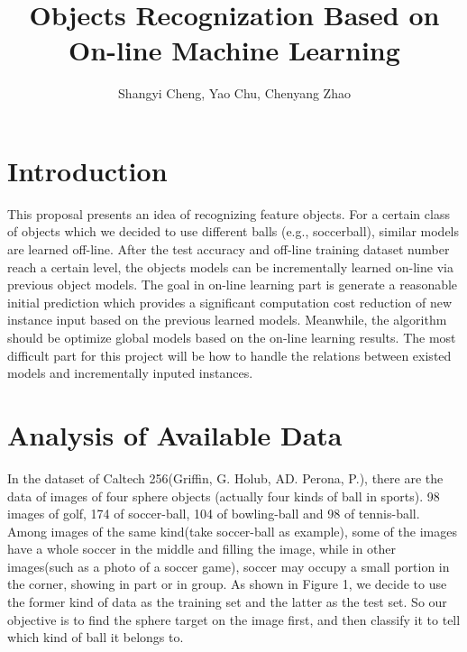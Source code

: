\documentclass[CEJM,PDF]{cej} %
\title{Objects Recognization Based on On-line Machine Learning}
\author{Shangyi Cheng\inst{}\email{shangyi@seas.upenn.edu}, Yao Chu\inst{}\email{chuyao@seas.upenn.edu}, Chenyang Zhao\inst{}\email{chzhao@seas.upenn.edu}}
\institute{University of Pennsylvania}
\begin{document}
\maketitle
\vspace*{-20pt}
\section{Introduction}
\vspace*{-10pt}
This proposal presents an idea of recognizing feature objects. For a certain class of objects which we decided to use different balls (e.g., soccerball), similar models are learned off-line. After the test accuracy and off-line training dataset number reach a certain level, the objects models can be incrementally learned on-line via previous object models. The goal in on-line learning part is generate a reasonable initial prediction which provides a significant computation cost reduction of new instance input based on the previous learned models. Meanwhile, the algorithm should be optimize global models based on the on-line learning results. The most difficult part for this project will be how to handle the relations between existed models and incrementally inputed instances. 
\vspace*{-20pt}
\section{Analysis of Available Data}
\vspace*{-10pt}
In the dataset of Caltech 256(Griffin, G. Holub, AD. Perona, P.), there are the data of images of four sphere objects (actually four kinds of ball in sports). 98 images of golf, 174 of soccer-ball, 104 of bowling-ball and 98 of tennis-ball. Among images of the same kind(take soccer-ball as example), some of the images have a whole soccer in the middle and filling the image, while in other images(such as a photo of a soccer game), soccer may occupy a small portion in the corner, showing in part or in group. As shown in Figure 1, we decide to use the former kind of data as the training set and the latter as the test set. So our objective is to find the sphere target on the image first, and then classify it to tell which kind of ball it belongs to.
\end{document}
